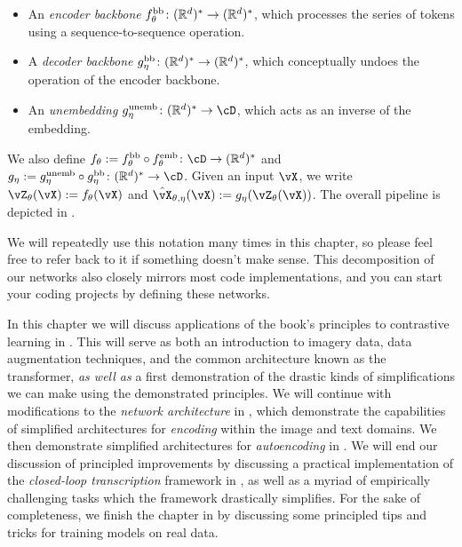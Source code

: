 \documentclass[\toplevelprefix/book-main.tex]{subfiles}
\begin{document}
\begin{itemize}
\begin{itemize}
        \item An \textit{encoder backbone} \(f_{\theta}^{\mathrm{bb}} \colon (\mathbb{R}^{d})^{*} \to (\mathbb{R}^{d})^{*}\), which processes the series of tokens using a sequence-to-sequence operation.
        \item A \textit{decoder backbone} \(g_{\eta}^{\mathrm{bb}} \colon (\mathbb{R}^{d})^{*} \to (\mathbb{R}^{d})^{*}\), which conceptually undoes the operation of the encoder backbone.
        \item An \textit{unembedding} \(g_{\eta}^{\unemb} \colon (\R^{d})^{*} \to \cD\), which acts as an inverse of the embedding.
    \end{itemize}
    We also define \(f_{\theta} := f_{\theta}^{\backbone} \circ f_{\theta}^{\emb} \colon \cD \to (\R^{d})^{*}\) and \(g_{\eta} := g_{\eta}^{\unemb} \circ g_{\eta}^{\backbone} \colon (\R^{d})^{*} \to \cD\). Given an input \(\vX\), we write \(\vZ_{\theta}(\vX) := f_{\theta}(\vX)\) and \(\hat{\vX}_{\theta, \eta}(\vX) := g_{\eta}(\vZ_{\theta}(\vX))\). The overall pipeline is depicted in .
\end{itemize}

We will repeatedly use this notation many times in this chapter, so please feel free to refer back to it if something doesn't make sense. This decomposition of our networks also closely mirrors most code implementations, and you can start your coding projects by defining these networks.

In this chapter we will discuss applications of the book's principles to contrastive learning in . This will serve as both an introduction to imagery data, data augmentation techniques, and the common architecture known as the transformer, \textit{as well as} a first demonstration of the drastic kinds of simplifications we can make using the demonstrated principles. We will continue with modifications to the \textit{network architecture} in , which demonstrate the capabilities of simplified architectures for \textit{encoding} within the image and text domains. We then demonstrate simplified architectures for \textit{autoencoding} in . We will end our discussion of principled improvements by discussing a practical implementation of the \textit{closed-loop transcription} framework in , as well as a myriad of empirically challenging tasks which the framework drastically simplifies. For the sake of completeness, we finish the chapter in  by discussing some principled tips and tricks for training models on real data.
\end{document}

